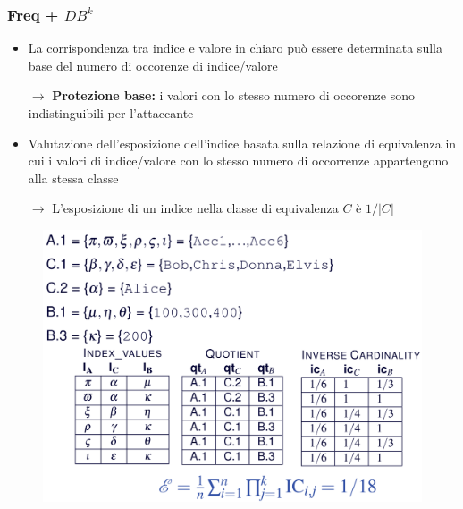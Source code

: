 \documentclass{report}
\begin{document}
\subsubsection{\textbf{Freq + $DB^k$}}

\begin{itemize}
    \item La corrispondenza tra indice e valore in chiaro può essere determinata sulla base 
    del numero di occorenze di indice/valore

    $\rightarrow$ \textbf{Protezione base:} i valori con lo stesso numero di occorenze sono indistinguibili per l'attaccante
    \item Valutazione dell'esposizione dell'indice basata sulla relazione di equivalenza
    in cui i valori di indice/valore con lo stesso numero di occorrenze
    appartengono alla stessa classe

    $\rightarrow$ L'esposizione di un indice nella classe di equivalenza $C$ è $1 / |C|$ 
\end{itemize}

\begin{figure}[ht]
    \centering
    \includegraphics[width=0.9\linewidth]{images/encryption/direct-freq-db.png}
\end{figure}
\end{document}
